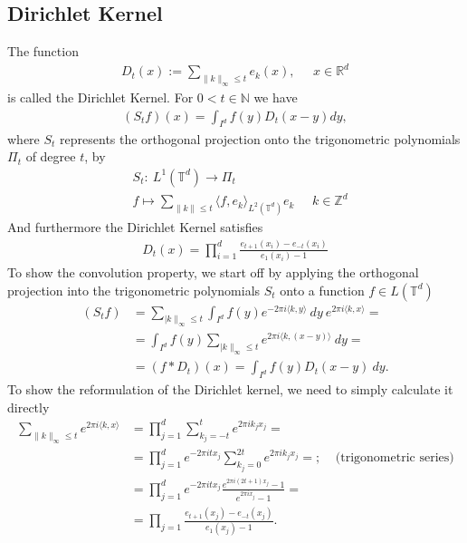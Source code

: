 \documentclass[a4paper]{article}
\begin{document}
\subsection{Dirichlet Kernel}
The function
\begin{align}
    D_t(x) := \sum_{\lVert k \rVert_\infty \leq t} e_k(x), \;\;\;\;\; x\in
    \mathbb{R}^d
\end{align}
is called the Dirichlet Kernel. For $0 < t \in \mathbb{N}$ we have
\begin{align}
    (S_tf)(x) = \int_{I^d} f(y) D_t(x-y) dy,
\end{align}
where $S_t$ represents the orthogonal projection onto the trigonometric
polynomials $\Pi_t$ of degree $t$, by
\begin{align}
    &S_t:\ L^1(\mathbb{T}^d) \rightarrow \Pi_t \\
    &f \mapsto \sum_{\lVert k \rVert \leq t} \langle f,
    e_k\rangle_{L^2(\mathbb{T}^d)} e_k \;\;\;\;\; k \in \mathbb{Z}^d
\end{align}
And furthermore the Dirichlet Kernel satisfies
\begin{align}
    D_t(x) = \prod_{i=1}^d \frac{e_{t+1}(x_i) - e_{-t}(x_i)}{e_1(x_i) - 1}
\end{align}
To show the convolution property, we start off by applying the orthogonal
projection into the trigonometric polynomials $S_t$ onto a function $f \in
L(\mathbb{T}^d)$
\begin{align}
    (S_tf) &= \sum_{\lvert k\rVert_\infty \leq t} \int_{I^d} f(y) e^{-2\pi i
    \langle k, y\rangle}\ dy\ e^{2\pi i\langle k, x\rangle} =\\
    &= \int_{I^d}f(y) \sum_{\lvert k\rVert_\infty \leq t} e^{2\pi i \langle
    k, (x- y)\rangle}\ dy =\\
    &= (f * D_t) (x) = \int_{I^d} f(y) D_t(x - y)\ dy.
\end{align}
To show the reformulation of the Dirichlet kernel, we need to simply
calculate it directly
\begin{align}
    \sum_{\lVert k \rVert_\infty \leq t} e^{2\pi i \langle k , x\rangle} &=
    \prod_{j=1}^d \sum_{k_j = -t}^t e^{2\pi i k_j x_j} =\\
    &= \prod_{j=1}^d e^{-2\pi i t x_j} \sum_{k_j = 0}^{2t} e^{2\pi i k_j
        x_j}=;\;\;\;\; \text{(trigonometric series)}\\
    &= \prod_{j=1}^d e^{-2\pi i t x_j} \frac{e^{2\pi i (2t + 1)x_j} -
    1}{e^{2\pi i x_j} - 1} =\\
    &= \prod_{j = 1} \frac{e_{t+1}(x_j) - e_{-t}(x_j)}{e_1(x_j) - 1}.
\end{align}
\end{document}
